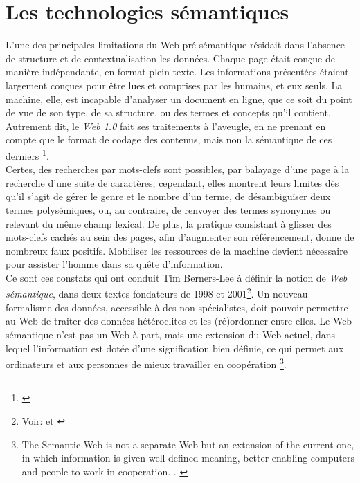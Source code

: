 \documentclass[a4paper,12pt,twoside]{book}
\begin{document}
\section{Les technologies sémantiques}

L'une des principales limitations du Web pré-sémantique résidait dans l'absence de structure et de contextualisation les données. Chaque page était conçue de manière indépendante, en format plein texte. Les informations présentées étaient largement conçues pour être lues et comprises par les humains, et eux seuls. La machine, elle, est incapable d'analyser un document en ligne, que ce soit du point de vue de son type, de sa structure, ou des termes et concepts qu'il contient. \og Autrement dit, le \textit{Web 1.0} fait ses traitements à l'aveugle, en ne prenant en compte que le format de codage des contenus, mais non la sémantique de ces derniers \fg\footnote{\cite[p.~24-25]{bachimontSensWebSemantique2011}}.\\

Certes, des recherches par mots-clefs sont possibles, par balayage d'une page à la recherche d'une suite de caractères; cependant, elles montrent leurs limites dès qu'il s'agit de gérer le genre et le nombre d'un terme, de désambiguïser deux termes polysémiques, ou, au contraire, de renvoyer des termes synonymes ou relevant du même champ lexical. De plus, la pratique consistant à glisser des mots-clefs cachés au sein des pages, afin d'augmenter son référencement, donne de nombreux faux positifs. Mobiliser les ressources de la machine devient nécessaire pour assister l'homme dans sa quête d'information.\\


Ce sont ces constats qui ont conduit Tim Berners-Lee à définir la notion de \textit{Web sémantique}, dans deux textes fondateurs de 1998 et 2001\footnote{Voir: \cite{berners-leeSemanticWebRoad1998} et \cite{berners-leeSemanticWeb2001}}. Un nouveau formalisme des données, accessible à des non-spécialistes, doit pouvoir permettre au  Web de traiter des données hétéroclites et les (ré)ordonner entre elles. \og Le Web sémantique n'est pas un Web à part, mais une extension du Web actuel, dans lequel l'information est dotée d'une signification bien définie, ce qui permet aux ordinateurs et aux personnes de mieux travailler en coopération \fg\footnote{\og The Semantic Web is not a separate Web but an extension of the current one, in which information is given well-defined meaning, better enabling computers and people to work in cooperation. \fg. \cite{berners-leeSemanticWeb2001}}.\\ 
\end{document}
